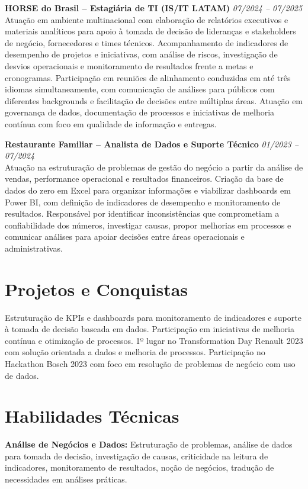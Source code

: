 \documentclass[11pt,a4paper]{article}
\newcommand{\experience}[3]{%
  \textbf{#1} \hfill \textit{#2}\\[4pt]
  #3
  \vspace{8pt}
}
\begin{document}
\experience{HORSE do Brasil -- Estagiária de TI (IS/IT LATAM)}{07/2024 -- 07/2025}{%
Atuação em ambiente multinacional com elaboração de relatórios executivos e materiais analíticos para apoio à tomada de decisão de lideranças e stakeholders de negócio, fornecedores e times técnicos. Acompanhamento de indicadores de desempenho de projetos e iniciativas, com análise de riscos, investigação de desvios operacionais e monitoramento de resultados frente a metas e cronogramas. Participação em reuniões de alinhamento conduzidas em até três idiomas simultaneamente, com comunicação de análises para públicos com diferentes backgrounds e facilitação de decisões entre múltiplas áreas. Atuação em governança de dados, documentação de processos e iniciativas de melhoria contínua com foco em qualidade de informação e entregas.}

\experience{Restaurante Familiar -- Analista de Dados e Suporte Técnico}{01/2023 -- 07/2024}{%
Atuação na estruturação de problemas de gestão do negócio a partir da análise de vendas, performance operacional e resultados financeiros. Criação da base de dados do zero em Excel para organizar informações e viabilizar dashboards em Power BI, com definição de indicadores de desempenho e monitoramento de resultados. Responsável por identificar inconsistências que comprometiam a confiabilidade dos números, investigar causas, propor melhorias em processos e comunicar análises para apoiar decisões entre áreas operacionais e administrativas.}

\section*{Projetos e Conquistas}

Estruturação de KPIs e dashboards para monitoramento de indicadores e suporte à tomada de decisão baseada em dados. Participação em iniciativas de melhoria contínua e otimização de processos. 1º lugar no Transformation Day Renault 2023 com solução orientada a dados e melhoria de processos. Participação no Hackathon Bosch 2023 com foco em resolução de problemas de negócio com uso de dados.

\section*{Habilidades Técnicas}

\textbf{Análise de Negócios e Dados:} Estruturação de problemas, análise de dados para tomada de decisão, investigação de causas, criticidade na leitura de indicadores, monitoramento de resultados, noção de negócios, tradução de necessidades em análises práticas.
\end{document}
